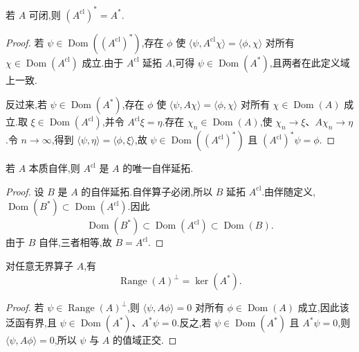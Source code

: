 \begin{proposition}[闭包的伴随]\label{prop:closure-adjoint}
若 \(A\) 可闭,则 \((A^{\mathrm{cl}})^{*}=A^{*}\).
\end{proposition}

\begin{proof}
若 \(\psi\in\operatorname{Dom}((A^{\mathrm{cl}})^{*})\),存在 \(\phi\) 使 \(\langle\psi,A^{\mathrm{cl}}\chi\rangle=\langle\phi,\chi\rangle\) 对所有 \(\chi\in\operatorname{Dom}(A^{\mathrm{cl}})\) 成立.由于 \(A^{\mathrm{cl}}\) 延拓 \(A\),可得 \(\psi\in\operatorname{Dom}(A^{*})\),且两者在此定义域上一致.

反过来,若 \(\psi\in\operatorname{Dom}(A^{*})\),存在 \(\phi\) 使 \(\langle\psi,A\chi\rangle=\langle\phi,\chi\rangle\) 对所有 \(\chi\in\operatorname{Dom}(A)\) 成立.取 \(\xi\in\operatorname{Dom}(A^{\mathrm{cl}})\),并令 \(A^{\mathrm{cl}}\xi=\eta\).存在 \(\chi_{n}\in\operatorname{Dom}(A)\),使 \(\chi_{n}\to\xi\)、\(A\chi_{n}\to\eta\).令 \(n\to\infty\),得到 \(\langle\psi,\eta\rangle=\langle\phi,\xi\rangle\),故 \(\psi\in\operatorname{Dom}((A^{\mathrm{cl}})^{*})\) 且 \((A^{\mathrm{cl}})^{*}\psi=\phi\).
\end{proof}

\begin{proposition}[本质自伴算子的唯一自伴延拓]\label{prop:unique-selfadjoint-extension}
若 \(A\) 本质自伴,则 \(A^{\mathrm{cl}}\) 是 \(A\) 的唯一自伴延拓.
\end{proposition}

\begin{proof}
设 \(B\) 是 \(A\) 的自伴延拓.自伴算子必闭,所以 \(B\) 延拓 \(A^{\mathrm{cl}}\).由伴随定义,\(\operatorname{Dom}(B^{*})\subset\operatorname{Dom}(A^{\mathrm{cl}})\).因此
\[
\operatorname{Dom}(B^{*})\subset\operatorname{Dom}(A^{\mathrm{cl}})\subset\operatorname{Dom}(B).
\]
由于 \(B\) 自伴,三者相等,故 \(B=A^{\mathrm{cl}}\).
\end{proof}

\begin{proposition}[无界算子的值域与伴随核]\label{prop:unbounded-range-kernel}
对任意无界算子 \(A\),有
\[
\operatorname{Range}(A)^{\perp}=\ker(A^{*}).
\]
\end{proposition}

\begin{proof}
若 \(\psi\in\operatorname{Range}(A)^{\perp}\),则 \(\langle\psi,A\phi\rangle=0\) 对所有 \(\phi\in\operatorname{Dom}(A)\) 成立,因此该泛函有界,且 \(\psi\in\operatorname{Dom}(A^{*})\)、\(A^{*}\psi=0\).反之,若 \(\psi\in\operatorname{Dom}(A^{*})\) 且 \(A^{*}\psi=0\),则 \(\langle\psi,A\phi\rangle=0\),所以 \(\psi\) 与 \(A\) 的值域正交.
\end{proof}

